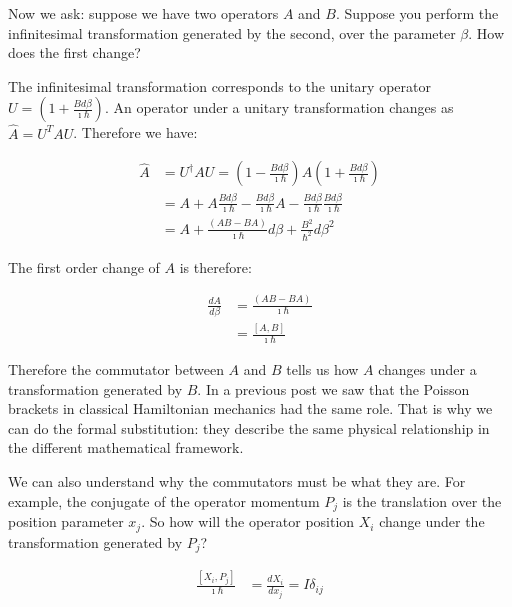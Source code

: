 \documentclass[aps,pra,10pt,floatfix,nofootinbib]{revtex4-1}
\theoremstyle{definition}
\begin{document}
Now we ask: suppose we have two operators $A$ and $B$. Suppose you perform the infinitesimal transformation generated by the second, over the parameter $\beta$. How does the first change?

The infinitesimal transformation corresponds to the unitary operator $U=(1 + \frac{B d\beta}{\imath \hbar})$. An operator under a unitary transformation changes as $\hat{A} = U^T A U$. Therefore we have:

\begin{equation}
\begin{aligned}
\hat{A}&=U^\dagger A U = (1 - \frac{B d\beta}{\imath \hbar}) A (1 + \frac{B d\beta}{\imath \hbar}) \\
&=A + A \frac{B d\beta}{\imath \hbar} - \frac{B d\beta}{\imath \hbar} A - \frac{B d\beta}{\imath \hbar} \frac{B d\beta}{\imath \hbar} \\
&=A + \frac{(AB - BA)}{\imath \hbar}d\beta + \frac{B^2}{\hbar^2}d\beta^2
\end{aligned}
\end{equation}

The first order change of $A$ is therefore:

\begin{equation}
\begin{aligned}
\frac{dA}{d\beta}&=\frac{(AB - BA)}{\imath \hbar} \\
&= \frac{[A,B]}{\imath \hbar}
\end{aligned}
\end{equation}

Therefore the commutator between $A$ and $B$ tells us how $A$ changes under a transformation generated by $B$. In a previous post we saw that the Poisson brackets in classical Hamiltonian mechanics had the same role. That is why we can do the formal substitution: they describe the same physical relationship in the different mathematical framework.

We can also understand why the commutators must be what they are. For example, the conjugate of the operator momentum $P_j$ is the translation over the position parameter $x_j$. So how will the operator position $X_i$ change under the transformation generated by $P_j$?

\begin{equation}
\begin{aligned}
\frac{[X_i,P_j]}{\imath \hbar} &= \frac{dX_i}{dx_j}=I \delta_{ij}
\end{aligned}
\end{equation}
\end{document}
